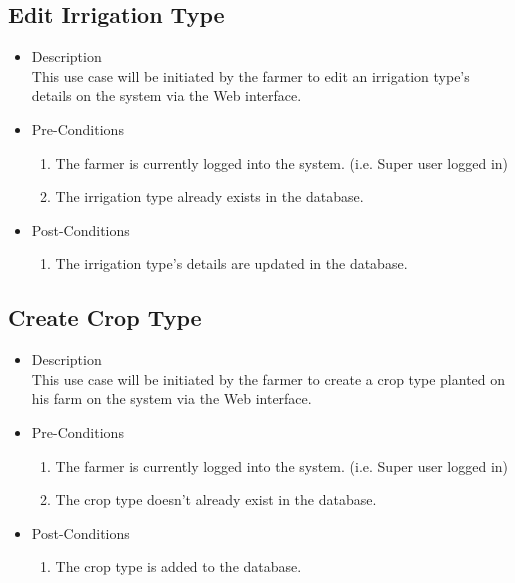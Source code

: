 \documentclass[11pt,fleqn]{book} %
\begin{document}
		\subsection{Edit Irrigation Type}
		\begin{itemize}
			\item Description\\
			This use case will be initiated by the farmer to edit an irrigation type’s details on the system via the Web interface.
			\item Pre-Conditions
			\begin{enumerate}
				\item The farmer is currently logged into the system. (i.e. Super user logged in)
				\item The irrigation type already exists in the database.					
			\end{enumerate}
			\item Post-Conditions
			\begin{enumerate}
				\item The irrigation type’s details are updated in the database.
			\end{enumerate}
		\end{itemize}
		
		\subsection{Create Crop Type}
		\begin{itemize}
			\item Description\\
			This use case will be initiated by the farmer to create a crop type planted on his farm on the system via the Web interface.
			\item Pre-Conditions
			\begin{enumerate}
				\item The farmer is currently logged into the system. (i.e. Super user logged in)
				\item The crop type doesn’t already exist in the database. 
			\end{enumerate}
			\item Post-Conditions
			\begin{enumerate}
				\item The crop type is added to the database.
			\end{enumerate}
		\end{itemize}
		
\end{document}
